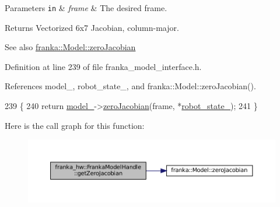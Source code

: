 \begin{DoxyParams}[1]{Parameters}
\mbox{\tt in}  & {\em frame} & The desired frame.\\
\hline
\end{DoxyParams}
\begin{DoxyReturn}{Returns}
Vectorized 6x7 Jacobian, column-\/major.
\end{DoxyReturn}
\begin{DoxySeeAlso}{See also}
\hyperlink{classfranka_1_1Model_a0b0fb1bf5f54be87bfaa023e4d0c5b9f}{franka\+::\+Model\+::zero\+Jacobian} 
\end{DoxySeeAlso}


Definition at line 239 of file franka\+\_\+model\+\_\+interface.\+h.



References model\+\_\+, robot\+\_\+state\+\_\+, and franka\+::\+Model\+::zero\+Jacobian().


\begin{DoxyCode}
239                                                                        \{
240     \textcolor{keywordflow}{return} \hyperlink{classfranka__hw_1_1FrankaModelHandle_a0c47e6c735f1bd809581b0498d53349b}{model\_}->\hyperlink{classfranka_1_1Model_a0b0fb1bf5f54be87bfaa023e4d0c5b9f}{zeroJacobian}(frame, *\hyperlink{classfranka__hw_1_1FrankaModelHandle_a16192f263ce4709d99f557c6d8fabeb1}{robot\_state\_});
241   \}
\end{DoxyCode}
Here is the call graph for this function\+:
\nopagebreak
\begin{figure}[H]
\begin{center}
\leavevmode
\includegraphics[width=350pt]{classfranka__hw_1_1FrankaModelHandle_a09d1582af0e1a0e8dd156f612c06b7f6_cgraph}
\end{center}
\end{figure}
\mbox{\label{classfranka__hw_1_1FrankaModelHandle_a5ce6ac6116ac3c45c923e5c2d515616c}} 
